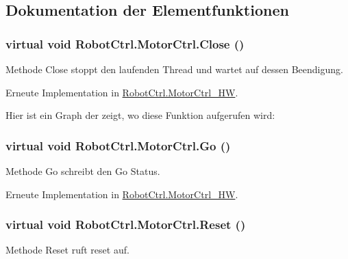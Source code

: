\subsection{Dokumentation der Elementfunktionen}
\hypertarget{class_robot_ctrl_1_1_motor_ctrl_aa4d43c3586f611f8ca12924b0a92189b}{
\subsubsection[{Close}]{\setlength{\rightskip}{0pt plus 5cm}virtual void RobotCtrl.MotorCtrl.Close ()}}
\label{class_robot_ctrl_1_1_motor_ctrl_aa4d43c3586f611f8ca12924b0a92189b}
Methode Close stoppt den laufenden Thread und wartet auf dessen Beendigung. 

Erneute Implementation in \hyperlink{class_robot_ctrl_1_1_motor_ctrl___h_w_a134912d08a58d3762ce7694294599d7c}{RobotCtrl.MotorCtrl\_\-HW}.



Hier ist ein Graph der zeigt, wo diese Funktion aufgerufen wird:

\hypertarget{class_robot_ctrl_1_1_motor_ctrl_a1c2505454168fc2d4287fe7052425d4e}{
\subsubsection[{Go}]{\setlength{\rightskip}{0pt plus 5cm}virtual void RobotCtrl.MotorCtrl.Go ()}}
\label{class_robot_ctrl_1_1_motor_ctrl_a1c2505454168fc2d4287fe7052425d4e}
Methode Go schreibt den Go Status. 

Erneute Implementation in \hyperlink{class_robot_ctrl_1_1_motor_ctrl___h_w_a451b6be6938c652e8a284545a1929089}{RobotCtrl.MotorCtrl\_\-HW}.

\hypertarget{class_robot_ctrl_1_1_motor_ctrl_a57b1bb7cb3895bc5d867848926b57f1e}{
\subsubsection[{Reset}]{\setlength{\rightskip}{0pt plus 5cm}virtual void RobotCtrl.MotorCtrl.Reset ()}}
\label{class_robot_ctrl_1_1_motor_ctrl_a57b1bb7cb3895bc5d867848926b57f1e}
Methode Reset ruft reset auf. 

